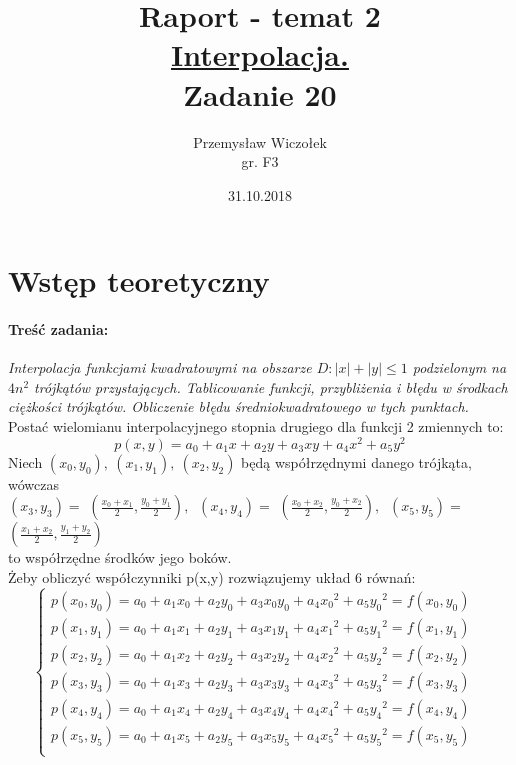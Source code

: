 \documentclass[12pt, leqno]{article}
\title{
    \Huge \textbf{Raport - temat 2} \linebreak
    \\[2pt]
    \LARGE 
    \uline{Interpolacja.} \\[5mm]
    Zadanie 20 
}
\date{31.10.2018}
\author{Przemysław Wiczołek \\ gr. F3}
\begin{document}
    \maketitle
    \newpage

    \section{Wstęp teoretyczny}
        \paragraph{Treść zadania:}
        \textit{Interpolacja funkcjami kwadratowymi na obszarze $D: |x|+|y| \leq 1$ podzielonym na $4n^2$
        trójkątów przystających. Tablicowanie funkcji, przybliżenia i błędu w środkach ciężkości trójkątów.
        Obliczenie błędu średniokwadratowego w tych punktach.} \\[5mm]
        Postać wielomianu interpolacyjnego stopnia drugiego dla funkcji 2 zmiennych to:
        \[ p(x,y) = a_0 + a_1x + a_2y + a_3xy + a_4x^2 + a_5y^2 \]
        Niech $(x_0, y_0),\: (x_1, y_1),\: (x_2, y_2)$ będą współrzędnymi danego trójkąta, wówczas\\[2mm]
        $(x_3, y_3) = $ {\large $(\frac{x_0 + x_1}{2}, \frac{y_0 + y_1}{2}),\:$}
        $(x_4, y_4) = $ {\large $(\frac{x_0 + x_2}{2}, \frac{y_0 + x_2}{2}),\:$}
        $(x_5, y_5) = $ {\large $(\frac{x_1 + x_2}{2}, \frac{y_1 + y_2}{2})$} \\[2mm] 
        to współrzędne środków jego boków.\\[3mm]
        Żeby obliczyć współczynniki p(x,y) rozwiązujemy układ 6 równań:
        \[
        \begin{cases}
            p(x_0, y_0) = a_0 + a_1x_0 + a_2y_0 + a_3x_0y_0 + a_4{x_0}^2 + a_5{y_0}^2 = f(x_0, y_0) &\\
            p(x_1, y_1) = a_0 + a_1x_1 + a_2y_1 + a_3x_1y_1 + a_4{x_1}^2 + a_5{y_1}^2 = f(x_1, y_1) &\\
            p(x_2, y_2) = a_0 + a_1x_2 + a_2y_2 + a_3x_2y_2 + a_4{x_2}^2 + a_5{y_2}^2 = f(x_2, y_2) &\\
            p(x_3, y_3) = a_0 + a_1x_3 + a_2y_3 + a_3x_3y_3 + a_4{x_3}^2 + a_5{y_3}^2 = f(x_3, y_3) &\\
            p(x_4, y_4) = a_0 + a_1x_4 + a_2y_4 + a_3x_4y_4 + a_4{x_4}^2 + a_5{y_4}^2 = f(x_4, y_4) &\\
            p(x_5, y_5) = a_0 + a_1x_5 + a_2y_5 + a_3x_5y_5 + a_4{x_5}^2 + a_5{y_5}^2 = f(x_5, y_5) &\\
        \end{cases}
        \]
\end{document}

